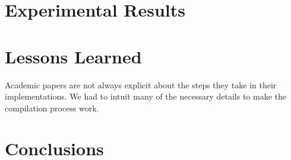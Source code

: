 \documentclass[11pt]{article}
\begin{document}
\section{Experimental Results}


\section{Lessons Learned}
Academic papers are not always explicit about the steps they take in their implementations.  We had to intuit many of the necessary details to make the compilation process work.

\section{Conclusions}
\end{document}
